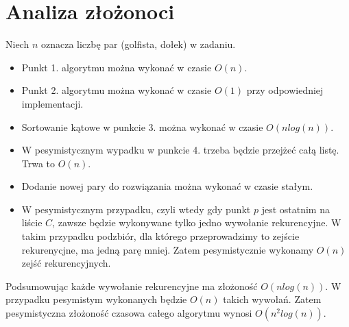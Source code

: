 \documentclass{article}
\begin{document}
\section{Analiza złożonoci}
Niech $n$ oznacza liczbę par (golfista, dołek) w zadaniu.
\begin{itemize}
\item Punkt 1. algorytmu można wykonać w czasie $O(n)$.
\item Punkt 2. algorytmu można wykonać w czasie $O(1)$ przy odpowiedniej implementacji.
\item Sortowanie kątowe w punkcie 3. można wykonać w czasie $O(nlog(n))$.
\item W pesymistycznym wypadku w punkcie 4. trzeba będzie przejżeć całą listę. Trwa to $O(n)$.
\item Dodanie nowej pary do rozwiązania można wykonać w czasie stałym.
\item W pesymistycznym przypadku, czyli wtedy gdy punkt $p$ jest ostatnim na liście $C$, zawsze będzie wykonywane tylko jedno wywołanie rekurencyjne. W takim przypadku podzbiór, dla którego przeprowadzimy to zejście rekurenycjne, ma jedną parę mniej. Zatem pesymistycznie wykonamy $O(n)$ zejść rekurencyjnych.
\end{itemize}
Podsumowując każde wywołanie rekurencyjne ma złożoność  $O(nlog(n))$. W przypadku pesymistym wykonanych będzie $O(n)$ takich wywołań. Zatem pesymistyczna złożoność czasowa całego algorytmu wynosi $O(n^2log(n))$.
\end{document}
